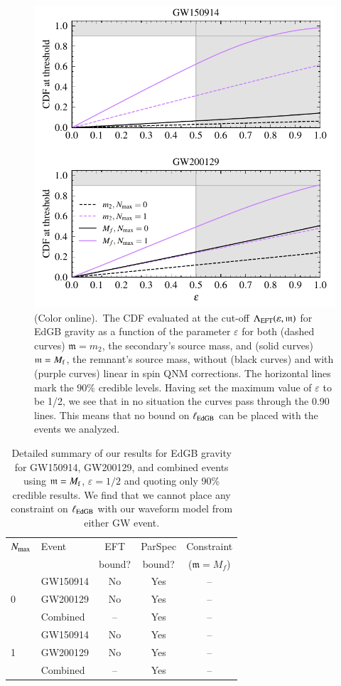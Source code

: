 \documentclass[twocolumn,
               prd,
               aps,
               superscriptaddress,
               tightenlines,
               nofootinbib,
               eqsecnum,
               amsfonts,
               amsmath,
               longbibliography]{revtex4-1}
\newcommand{\gm}{\mathfrak{m}}
\begin{document}
\begin{figure}[t]
\includegraphics[width=\columnwidth]{figs/edgb_cdf_varying_threshold.pdf}
\caption{(Color online).~The CDF evaluated at the
cut-off $\Lambda_{\rm EFT}(\varepsilon,\gm)$ for EdGB gravity as a function of the parameter
$\varepsilon$ for both (dashed curves) $\gm = m_2$, the secondary's source
mass, and (solid curves) $\gm = M_{\rm f}$, the remnant's source mass, without
(black curves) and with (purple curves) linear in spin QNM corrections. The
horizontal lines mark the $90\%$ credible levels. Having set the maximum value
of $\varepsilon$ to be 1/2, we see that in no situation the curves pass
through the 0.90 lines. This means that no bound on $\ell_{\rm EdGB}$ can be placed
with the events we analyzed.
}
\label{fig:edgb_cdf}
\end{figure}

\begin{table}[h]
\begin{tabular}{l l c c c}
\hline
\hline
$N_{\rm max}$ & Event &  EFT    & ParSpec & Constraint      \\
              &       &  bound? & bound?  & ($\gm = M_{f}$) \\
\hline
  & GW150914 & No  & Yes & -- \\
0 & GW200129 & No  & Yes & -- \\
  & Combined & --  & Yes & -- \\
\hline
  & GW150914 & No  & Yes & -- \\
1 & GW200129 & No  & Yes & -- \\
  & Combined & --  & Yes & -- \\
\hline
\hline
\end{tabular}
\caption{Detailed summary of our results for EdGB gravity for GW150914, GW200129, and
combined events using $\gm = M_{\rm f}$, $\varepsilon = 1/2$ and quoting only 90\% credible results.
%
We find that we cannot place any constraint on $\ell_{\rm EdGB}$ with our waveform model from either GW event.
}
\label{tab:summary_edgb}
\end{table}
\end{document}
